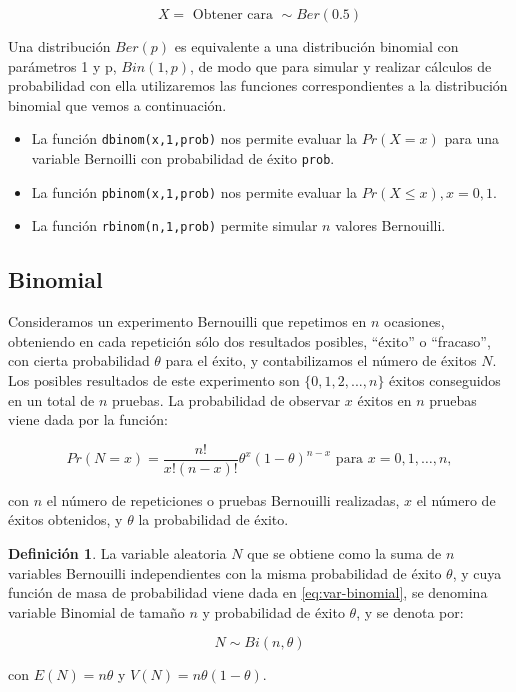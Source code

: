 \documentclass[
]{book}
\providecommand{\tightlist}{%
  \setlength{\itemsep}{0pt}\setlength{\parskip}{0pt}}
\newenvironment{yellowbox}{
  \definecolor{shadecolor}{rgb}{210, 180, 140}  
  \color{black}
  \begin{shaded}}
 {\end{shaded}}
\newenvironment{whitebox}{
  \definecolor{shadecolor}{rgb}{255, 255, 255}  
  \color{black}
  \begin{shaded}}
 {\end{shaded}}
\theoremstyle{definition}
\newtheorem{definition}{Definición}[chapter]
\theoremstyle{definition}
\theoremstyle{definition}
\theoremstyle{definition}
\theoremstyle{remark}
\begin{document}
\[X = \text{ Obtener cara } \sim Ber(0.5)\]

\begin{whitebox}

Una distribución \(Ber(p)\) es equivalente a una distribución binomial con parámetros 1 y p, \(Bin(1,p)\), de modo que para simular y realizar cálculos de probabilidad con ella utilizaremos las funciones correspondientes a la distribución binomial que vemos a continuación.

\begin{itemize}
\tightlist
\item
  La función \texttt{dbinom(x,1,prob)} nos permite evaluar la \(Pr(X=x)\) para una variable Bernoilli con probabilidad de éxito \texttt{prob}.
\item
  La función \texttt{pbinom(x,1,prob)} nos permite evaluar la \(Pr(X \leq x), x=0,1\).
\item
  La función \texttt{rbinom(n,1,prob)} permite simular \(n\) valores Bernouilli.
\end{itemize}

\end{whitebox}

\hypertarget{binomial}{%
\subsection{Binomial}\label{binomial}}

Consideramos un experimento Bernouilli que repetimos en \(n\) ocasiones, obteniendo en cada repetición sólo dos resultados posibles, ``éxito'' o ``fracaso'', con cierta probabilidad \(\theta\) para el éxito, y contabilizamos el número de éxitos \(N\). Los posibles resultados de este experimento son \(\{0, 1, 2,...,n\}\) éxitos conseguidos en un total de \(n\) pruebas. La probabilidad de observar \(x\) éxitos en \(n\) pruebas viene dada por la función:

\begin{equation}
Pr(N = x) = \frac{n!}{x!(n-x)!}  \theta^{x} (1-\theta)^{n-x}  \text{ para } x = 0, 1,\ldots,n,
\label{eq:var-binomial}
\end{equation}

con \(n\) el número de repeticiones o pruebas Bernouilli realizadas, \(x\) el número de éxitos obtenidos, y \(\theta\) la probabilidad de éxito.

\begin{yellowbox}

\begin{definition}
\protect\hypertarget{def:vbinom}{}\label{def:vbinom}La variable aleatoria \(N\) que se obtiene como la suma de \(n\) variables Bernouilli independientes con la misma probabilidad de éxito \(\theta\), y cuya función de masa de probabilidad viene dada en \eqref{eq:var-binomial}, se denomina variable Binomial de tamaño \(n\) y probabilidad de éxito \(\theta\), y se denota por:

\[N \sim Bi(n,\theta)\]

con \(E(N) = n\theta\) y \(V(N) = n\theta(1-\theta).\)
\end{definition}

\end{yellowbox}
\end{document}
